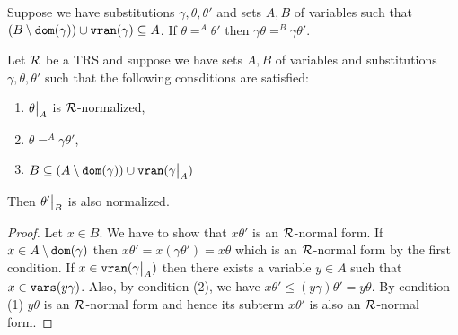 \begin{proposition}\label{proposition:change-of-domain}
	Suppose we have substitutions $\gamma, \theta, \theta'$ and sets $A,B$ of variables such that $(B \setminus \mathtt{dom}(\gamma)) \cup \mathtt{v}\mathtt{ran}(\gamma) \subseteq A$. If $\theta =^{A} \theta'$ then $\gamma\theta =^{B} \gamma\theta'$.
\end{proposition}

\begin{proposition}\label{proposition:change-of-domain-normalized}
	Let $\mathcal{R}$ be a TRS and suppose we have sets $A,B$ of variables and substitutions $\gamma, \theta, \theta'$ such that the following consditions are satisfied:
	\begin{enumerate}
		\item $\restr{\theta}{A}$ is $\mathcal{R}$-normalized,
		\item $\theta =^A \gamma \theta'$,
		\item $B \subseteq (A \setminus \dom{\gamma}) \cup \vran{\restr{\gamma}{A}}$
	\end{enumerate}
	Then $\restr{\theta'}{B}$ is also normalized.
	\begin{proof}
		Let $x \in B$. We have to show that $x\theta'$ is an $\mathcal{R}$-normal form. If $x \in A \setminus \mathtt{dom}(\gamma)$ then $x\theta' = x(\gamma\theta') = x\theta$ which is an $\mathcal{R}$-normal form by the first condition. If $x \in \vran{\restr{\gamma}{A}}$ then there exists a variable $y \in A$ such that $x \in \mathtt{vars}(y\gamma)$. Also, by condition (2), we have $x\theta' \leq (y\gamma)\theta' = y\theta$. By condition (1) $y\theta$ is an $\mathcal{R}$-normal form and hence its subterm $x\theta'$ is also an $\mathcal{R}$-normal form.
	\end{proof}
\end{proposition}

